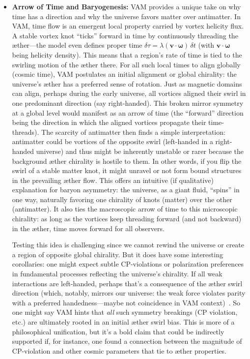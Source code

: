 \documentclass[a4paper,12pt]{article}
\begin{document}
\begin{itemize}
\item 
\textbf{Arrow of Time and Baryogenesis:} VAM provides a unique take on why time has a direction and why the universe favors matter over antimatter. In VAM, time flow is an emergent local property carried by vortex helicity flux. A stable vortex knot “ticks” forward in time by continuously threading the æther---the model even defines proper time $\delta\tau = \lambda ( \mathbf{v}\cdot\boldsymbol{\omega})\,\delta t$ (with $\mathbf{v}\cdot\boldsymbol{\omega}$ being helicity density). This means that a region’s rate of time is tied to the swirling motion of the æther there. For all such local times to align globally (cosmic time), VAM postulates an initial alignment or global chirality: the universe’s æther has a preferred sense of rotation. Just as magnetic domains can align, perhaps during the early universe, all vortices aligned their swirl in one predominant direction (say right-handed). This broken mirror symmetry at a global level would manifest as an arrow of time (the “forward” direction being the direction in which the aligned vortices propagate their time-threads). The scarcity of antimatter then finds a simple interpretation: antimatter could be vortices of the opposite swirl (left-handed in a right-handed universe) and thus might be inherently unstable or rarer because the background æther chirality is hostile to them. In other words, if you flip the swirl of a stable matter knot, it might unravel or not form bound structures in the prevailing æther flow. This offers an intuitive (if qualitative) explanation for baryon asymmetry: the universe, as a giant fluid, “spins” in one way, naturally favoring one chirality of knots (matter) over the other (antimatter). It also ties the macroscopic arrow of time to this microscopic chirality: as long as the vortices keep threading forward (and not backward) in the æther, time moves forward for all observers.

Testing this idea is challenging since we cannot rewind the universe or create a region of opposite global chirality. But it does have some interesting corollaries: one might expect subtle CP-violations or polarization preferences in fundamental processes reflecting the universe’s chirality. If all weak interactions are left-handed, perhaps that’s a consequence of the æther swirl direction (which, notably, mirrors our universe: the weak force violates parity with a preferred handedness---maybe not coincidence in VAM context)~\cite{lee1956parity}. So one might say VAM hints that \textit{all} such symmetry breakings (CP violation, etc.) are ultimately rooted in an initial æther swirl bias. This is more of a philosophical unification, but it’s a bold claim that could be indirectly supported if, for instance, one found a connection between the magnitude of CP-violation and other cosmic parameters that tie to æther properties.


\end{itemize}
\end{document}
